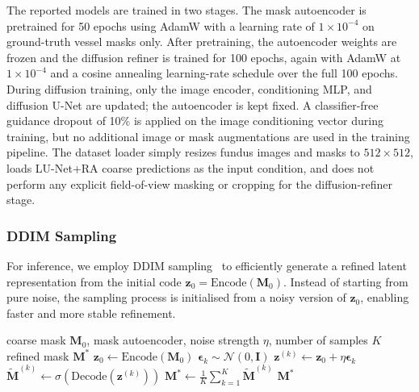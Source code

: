 \documentclass[journal,article,submit,pdftex,moreauthors]{Definitions/mdpi}
\begin{document}
The reported models are trained in two stages. The mask autoencoder is pretrained for 50 epochs using AdamW with a learning rate of $1\times10^{-4}$ on ground-truth vessel masks only. After pretraining, the autoencoder weights are frozen and the diffusion refiner is trained for 100 epochs, again with AdamW at $1\times10^{-4}$ and a cosine annealing learning-rate schedule over the full 100 epochs. During diffusion training, only the image encoder, conditioning MLP, and diffusion U-Net are updated; the autoencoder is kept fixed. A classifier-free guidance dropout of 10\% is applied on the image conditioning vector during training, but no additional image or mask augmentations are used in the training pipeline. The dataset loader simply resizes fundus images and masks to $512\times512$, loads LU-Net+RA coarse predictions as the input condition, and does not perform any explicit field-of-view masking or cropping for the diffusion-refiner stage.

\subsubsection{DDIM Sampling}

For inference, we employ DDIM sampling~\cite{Song2021} to efficiently generate a refined latent representation from the initial code $\mathbf{z}_0=\mathrm{Encode}(\mathbf{M}_0)$. Instead of starting from pure noise, the sampling process is initialised from a noisy version of $\mathbf{z}_0$, enabling faster and more stable refinement.

\begin{algorithm}
\caption{Latent Refinement Sampling}
\label{alg:latent_refinement}
\begin{algorithmic}[1]
\Require coarse mask $\mathbf{M}_0$, mask autoencoder, noise strength $\eta$, number of samples $K$
\Ensure refined mask $\mathbf{M}^*$
\State $\mathbf{z}_0 \gets \mathrm{Encode}(\mathbf{M}_0)$
  \State $\boldsymbol{\epsilon}_k \sim \mathcal{N}(0,\mathbf{I})$
  \State $\mathbf{z}^{(k)} \gets \mathbf{z}_0 + \eta\boldsymbol{\epsilon}_k$
  \State $\tilde{\mathbf{M}}^{(k)} \gets \sigma(\mathrm{Decode}(\mathbf{z}^{(k)}))$
\EndFor
\State $\mathbf{M}^* \gets \frac{1}{K}\sum_{k=1}^{K}\tilde{\mathbf{M}}^{(k)}$
\State \Return $\mathbf{M}^*$
\end{algorithmic}
\end{algorithm}
\end{document}
